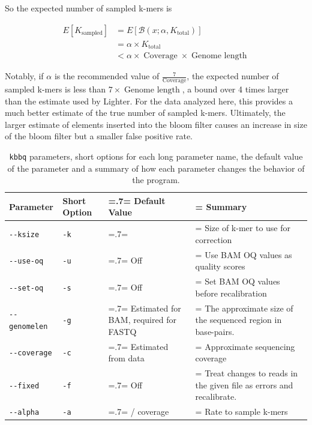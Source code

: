 \documentclass{article}
\begin{document}
\begin{outline}
	\item So the expected number of sampled k-mers is

	\begin{align}
	E[K_{\operatorname{sampled}}] &= E[\mathcal{B}(x; \alpha, K_{\operatorname{total}})] \\
	&= \alpha \times K_{\operatorname{total}} \\
	&< \alpha \times \operatorname{Coverage} \times \operatorname{Genome\:length}
	\end{align}

	\item Notably, if $\alpha$ is the recommended value of $\frac{7}{\operatorname{Coverage}}$, the expected number of sampled k-mers is less than $7 \times \operatorname{Genome\:length}$, a bound over 4 times larger than the estimate used by Lighter. For the data analyzed here, this provides a much better estimate of the true number of sampled k-mers. Ultimately, the larger estimate of elements inserted into the bloom filter causes an increase in size of the bloom filter but a smaller false positive rate.

\end{outline}

	\begin{table}
	\begin{tabularx}{\textwidth}{| l | l | >{\hsize=.7\hsize\linewidth=\hsize}X | >{\hsize=1.3\hsize\linewidth=\hsize}X | }
	\hline
	\textbf{Parameter} & \textbf{Short Option} & \textbf{Default Value} & \textbf{Summary} \\
	\hline
	\texttt{-\phantom{}-ksize} & \texttt{-k} & 32 & Size of k-mer to use for correction\\
	\texttt{-\phantom{}-use-oq} & \texttt{-u} & Off & Use BAM OQ values as quality scores\\
	\texttt{-\phantom{}-set-oq} & \texttt{-s} & Off & Set BAM OQ values before recalibration\\
	\texttt{-\phantom{}-genomelen} & \texttt{-g} & Estimated for BAM, \newline required for FASTQ & The approximate size of the sequenced region in base-pairs.\\
	\texttt{-\phantom{}-coverage} & \texttt{-c} & Estimated from data & Approximate sequencing coverage\\
	\texttt{-\phantom{}-fixed} & \texttt{-f} & Off & Treat changes to reads in the given file as errors and recalibrate. \\
	\texttt{-\phantom{}-alpha} & \texttt{-a} & 7 / coverage & Rate to sample k-mers\\
	\hline
	\end{tabularx}
	\caption{\texttt{kbbq} parameters, short options for each long parameter name, the default value of the parameter and a summary of how each parameter changes the behavior of the program.}
	\label{table:params}
	\end{table}
\end{document}
